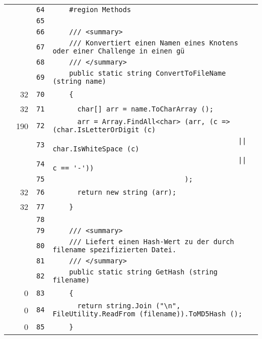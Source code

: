 \documentclass[a4paper,10pt]{article}
\begin{document}
\begin{longtable}[l]{lrrl}
\cellcolor{gray} &  & \verb~64~ & \verb~    #region Methods~\\
\cellcolor{gray} &  & \verb~65~ & \verb~~\\
\cellcolor{gray} &  & \verb~66~ & \verb~    /// <summary>~\\
\cellcolor{gray} &  & \verb~67~ & \verb~    /// Konvertiert einen Namen eines Knotens oder einer Challenge in einen gü~\\
\cellcolor{gray} &  & \verb~68~ & \verb~    /// </summary>~\\
\cellcolor{gray} &  & \verb~69~ & \verb~    public static string ConvertToFileName (string name)~\\
\cellcolor{green} & 32 & \verb~70~ & \verb~    {~\\
\cellcolor{green} & 32 & \verb~71~ & \verb~      char[] arr = name.ToCharArray ();~\\
\cellcolor{green} & 190 & \verb~72~ & \verb~      arr = Array.FindAll<char> (arr, (c => (char.IsLetterOrDigit (c)~\\
\cellcolor{gray} &  & \verb~73~ & \verb~                                             || char.IsWhiteSpace (c)~\\
\cellcolor{gray} &  & \verb~74~ & \verb~                                             || c == '-'))~\\
\cellcolor{gray} &  & \verb~75~ & \verb~                                );~\\
\cellcolor{green} & 32 & \verb~76~ & \verb~      return new string (arr);~\\
\cellcolor{green} & 32 & \verb~77~ & \verb~    }~\\
\cellcolor{gray} &  & \verb~78~ & \verb~~\\
\cellcolor{gray} &  & \verb~79~ & \verb~    /// <summary>~\\
\cellcolor{gray} &  & \verb~80~ & \verb~    /// Liefert einen Hash-Wert zu der durch filename spezifizierten Datei.~\\
\cellcolor{gray} &  & \verb~81~ & \verb~    /// </summary>~\\
\cellcolor{gray} &  & \verb~82~ & \verb~    public static string GetHash (string filename)~\\
\cellcolor{red} & 0 & \verb~83~ & \verb~    {~\\
\cellcolor{red} & 0 & \verb~84~ & \verb~      return string.Join ("\n", FileUtility.ReadFrom (filename)).ToMD5Hash ();~\\
\cellcolor{red} & 0 & \verb~85~ & \verb~    }~\\

\end{longtable}
\end{document}
